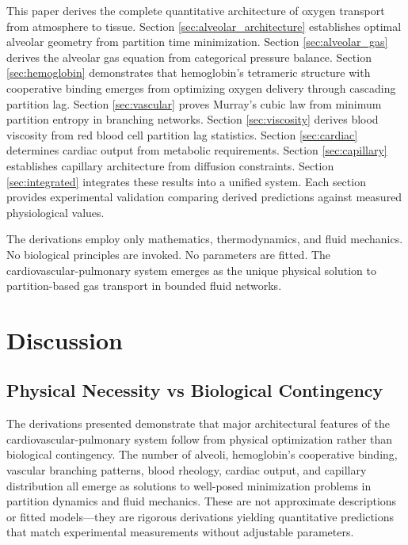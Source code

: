 \documentclass[12pt,a4paper]{article}
\theoremstyle{remark}
\begin{document}
This paper derives the complete quantitative architecture of oxygen transport from atmosphere to tissue. Section \ref{sec:alveolar_architecture} establishes optimal alveolar geometry from partition time minimization. Section \ref{sec:alveolar_gas} derives the alveolar gas equation from categorical pressure balance. Section \ref{sec:hemoglobin} demonstrates that hemoglobin's tetrameric structure with cooperative binding emerges from optimizing oxygen delivery through cascading partition lag. Section \ref{sec:vascular} proves Murray's cubic law from minimum partition entropy in branching networks. Section \ref{sec:viscosity} derives blood viscosity from red blood cell partition lag statistics. Section \ref{sec:cardiac} determines cardiac output from metabolic requirements. Section \ref{sec:capillary} establishes capillary architecture from diffusion constraints. Section \ref{sec:integrated} integrates these results into a unified system. Each section provides experimental validation comparing derived predictions against measured physiological values.

The derivations employ only mathematics, thermodynamics, and fluid mechanics. No biological principles are invoked. No parameters are fitted. The cardiovascular-pulmonary system emerges as the unique physical solution to partition-based gas transport in bounded fluid networks.










\section{Discussion}

\subsection{Physical Necessity vs Biological Contingency}

The derivations presented demonstrate that major architectural features of the cardiovascular-pulmonary system follow from physical optimization rather than biological contingency. The number of alveoli, hemoglobin's cooperative binding, vascular branching patterns, blood rheology, cardiac output, and capillary distribution all emerge as solutions to well-posed minimization problems in partition dynamics and fluid mechanics. These are not approximate descriptions or fitted models—they are rigorous derivations yielding quantitative predictions that match experimental measurements without adjustable parameters.
\end{document}
